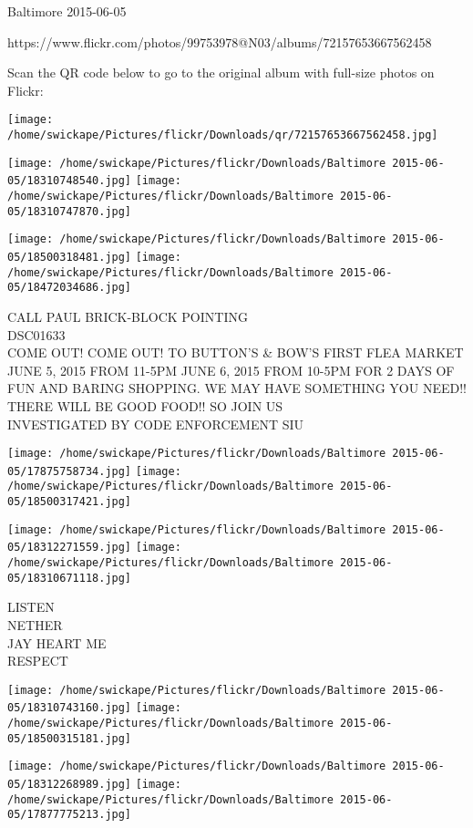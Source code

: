 \documentclass[10pt,letterpaper]{article}
\begin{document}
Baltimore 2015-06-05

https://www.flickr.com/photos/99753978@N03/albums/72157653667562458

Scan the QR code below to go to the original album with full-size photos on Flickr:

\texttt{[image: /home/swickape/Pictures/flickr/Downloads/qr/72157653667562458.jpg]}
\pagebreak

\texttt{[image: /home/swickape/Pictures/flickr/Downloads/Baltimore 2015-06-05/18310748540.jpg]}
\texttt{[image: /home/swickape/Pictures/flickr/Downloads/Baltimore 2015-06-05/18310747870.jpg]}

\texttt{[image: /home/swickape/Pictures/flickr/Downloads/Baltimore 2015-06-05/18500318481.jpg]}
\texttt{[image: /home/swickape/Pictures/flickr/Downloads/Baltimore 2015-06-05/18472034686.jpg]}

CALL PAUL BRICK{-}BLOCK POINTING\\
DSC01633\\
COME OUT!  COME OUT!  TO BUTTON'S \& BOW'S FIRST FLEA MARKET JUNE 5, 2015 FROM 11{-}5PM JUNE 6, 2015 FROM 10{-}5PM FOR 2 DAYS OF FUN AND BARING SHOPPING.  WE MAY HAVE SOMETHING YOU NEED!! THERE WILL BE GOOD FOOD!! SO JOIN US\\
INVESTIGATED BY CODE ENFORCEMENT SIU\\
\pagebreak

\texttt{[image: /home/swickape/Pictures/flickr/Downloads/Baltimore 2015-06-05/17875758734.jpg]}
\texttt{[image: /home/swickape/Pictures/flickr/Downloads/Baltimore 2015-06-05/18500317421.jpg]}

\texttt{[image: /home/swickape/Pictures/flickr/Downloads/Baltimore 2015-06-05/18312271559.jpg]}
\texttt{[image: /home/swickape/Pictures/flickr/Downloads/Baltimore 2015-06-05/18310671118.jpg]}

LISTEN\\
NETHER\\
JAY HEART ME\\
RESPECT\\
\pagebreak

\texttt{[image: /home/swickape/Pictures/flickr/Downloads/Baltimore 2015-06-05/18310743160.jpg]}
\texttt{[image: /home/swickape/Pictures/flickr/Downloads/Baltimore 2015-06-05/18500315181.jpg]}

\texttt{[image: /home/swickape/Pictures/flickr/Downloads/Baltimore 2015-06-05/18312268989.jpg]}
\texttt{[image: /home/swickape/Pictures/flickr/Downloads/Baltimore 2015-06-05/17877775213.jpg]}
\end{document}
